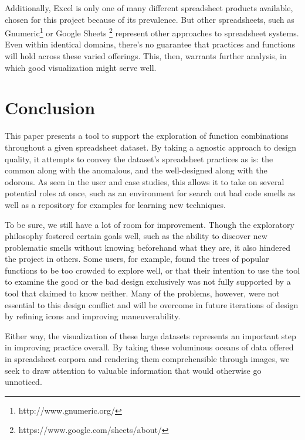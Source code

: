 \documentclass[conference]{IEEEtran}
\begin{document}
	Additionally, Excel is only one of many different spreadsheet products
	available, chosen for this project because of its prevalence. But other
	spreadsheets, such as Gnumeric\footnote{http://www.gnumeric.org/} or Google
	Sheets \footnote{https://www.google.com/sheets/about/} represent other
	approaches to spreadsheet systems. Even within identical domains, there's no
	guarantee that practices and functions will hold across these varied offerings.
	This, then, warrants further analysis, in which good visualization might serve
	well. \par
	
	\section{Conclusion} This paper presents a tool to support the exploration of
	function combinations throughout a given spreadsheet dataset. By taking a
	agnostic approach to design quality, it attempts to convey the dataset's
	spreadsheet practices as is: the common along with the anomalous, and the
	well-designed along with the odorous. As seen in the user and case studies,
	this allows it to take on several potential roles at once, such as an
	environment for search out bad code smells as well as a repository for examples
	for learning new techniques. \par
	
	To be sure, we still have a lot of room for improvement. Though the exploratory
	philosophy fostered certain goals well, such as the ability to discover new
	problematic smells without knowing beforehand what they are, it also hindered
	the project in others. Some users, for example, found the trees of popular
	functions to be too crowded to explore well, or that their intention to use the
	tool to examine the good or the bad design exclusively was not fully supported
	by a tool that claimed to know neither. Many of the problems, however, were not
	essential to this design conflict and will be overcome in future iterations of
	design by refining icons and improving maneuverability. \par
	
	Either way, the visualization of these large datasets represents an important
	step in improving practice overall. By taking these voluminous oceans of data
	offered in spreadsheet corpora and rendering them comprehensible through
	images, we seek to draw attention to valuable information that would otherwise
	go unnoticed.
	
\end{document}
